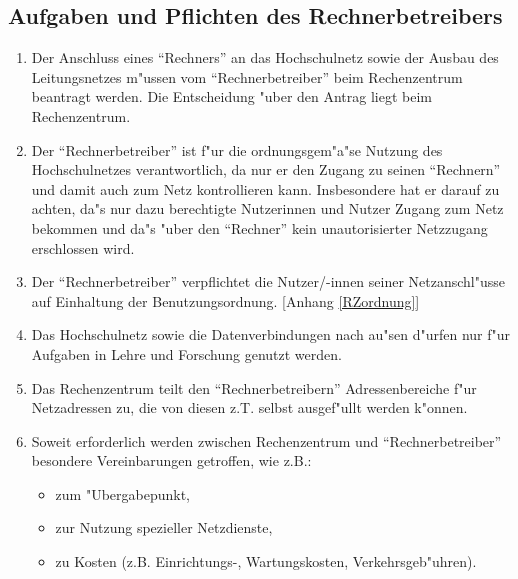 \subsection{Aufgaben und Pflichten des Rechnerbetreibers}

\begin{enumerate}
  \item Der Anschluss eines "`Rechners"' an das Hochschulnetz sowie
    der Ausbau des Leitungsnetzes m"ussen vom "`Rechnerbetreiber"'
    beim Rechenzentrum beantragt werden. Die Entscheidung "uber
    den Antrag liegt beim Rechenzentrum.

  \item Der "`Rechnerbetreiber"' ist f"ur die ordnungsgem"a"se
    Nutzung des Hochschulnetzes verantwortlich, da nur er den
    Zugang zu seinen "`Rechnern"' und damit auch zum Netz kontrollieren
    kann. Insbesondere hat er darauf zu achten, da"s nur
    dazu berechtigte Nutzerinnen und Nutzer Zugang zum Netz
    bekommen und da"s "uber den "`Rechner"' kein
    unautorisierter Netzzugang erschlossen wird.

  \item Der "`Rechnerbetreiber"' verpflichtet die Nutzer/-innen seiner
    Netzanschl"usse auf Einhaltung der Benutzungsordnung. [Anhang
    \ref{RZordnung}]

  \item Das Hochschulnetz sowie die Datenverbindungen nach au"sen
    d"urfen nur f"ur Aufgaben in Lehre und Forschung
    genutzt werden.

  \item Das Rechenzentrum teilt den "`Rechnerbetreibern"' Adressenbereiche
    f"ur Netzadressen zu, die von diesen z.T. selbst ausgef"ullt werden k"onnen.

  \item Soweit erforderlich werden zwischen Rechenzentrum und
    "`Rechnerbetreiber"' besondere Vereinbarungen getroffen, wie z.B.:
    \begin{itemize}
      \item zum "Ubergabepunkt,
      \item zur Nutzung spezieller Netzdienste,
      \item zu Kosten (z.B. Einrichtungs-, Wartungskosten,
        Verkehrsgeb"uhren).
    \end{itemize}
\end{enumerate}
